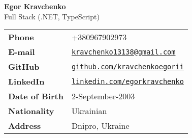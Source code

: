 \textbf{\LARGE Egor Kravchenko} \\
Full Stack (.NET, TypeScript)
\hspace*{0.55\textwidth}
\begin{tabular*}{\textwidth}{ll}
    \textbf{Phone}         & +380967902973                                                                      \\
    \textbf{E-mail}        & \href{mailto:kravchenko13138@gmail.com}{\verb"kravchenko13138@gmail.com"}                   \\
    \textbf{GitHub}        & \href{https://github.com/kravchenkoegorii}{\verb"github.com/kravchenkoegorii"}            \\
    \textbf{LinkedIn}      & \href{https://www.linkedin.com/in/egorkravchenko}{\verb"linkedin.com/egorkravchenko"} \\
    \textbf{Date of Birth} & 2-September-2003                                                                      \\
    \textbf{Nationality}   & Ukrainian                                                                         \\
    \textbf{Address}       & Dnipro, Ukraine
\end{tabular*}